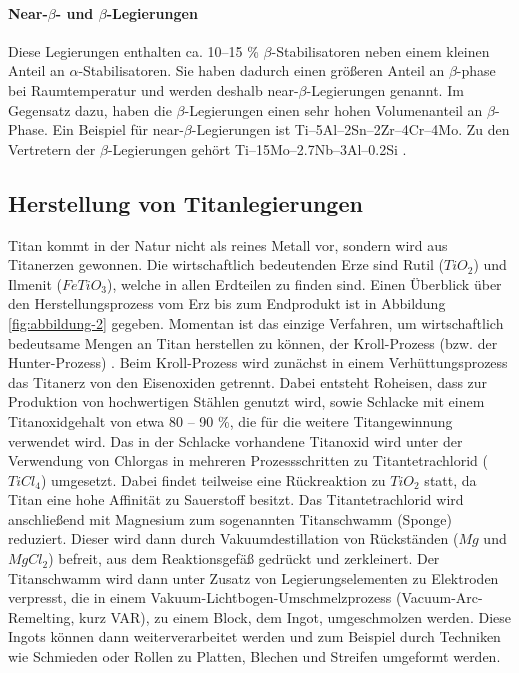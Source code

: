 \paragraph{Near-$\beta$- und $\beta$-Legierungen}
Diese Legierungen enthalten ca. 10--15 \% $\beta$-Stabilisatoren neben einem kleinen Anteil an $\alpha$-Stabilisatoren. Sie haben dadurch einen größeren Anteil an $\beta$-phase bei Raumtemperatur und werden deshalb near-$\beta$-Legierungen genannt. Im Gegensatz dazu, haben die $\beta$-Legierungen einen sehr hohen Volumenanteil an $\beta$-Phase. Ein Beispiel für near-$\beta$-Legierungen ist Ti–5Al–2Sn–2Zr–4Cr–4Mo. Zu den Vertretern der $\beta$-Legierungen gehört Ti–15Mo–2.7Nb–3Al–0.2Si \cite{Boyer.2007,M.J.Donachie.2010}.

\subsection{Herstellung von Titanlegierungen}
Titan kommt in der Natur nicht als reines Metall vor, sondern wird aus Titanerzen gewonnen. Die wirtschaftlich bedeutenden Erze sind Rutil ($TiO_2$) und Ilmenit ($FeTiO_3$), welche in allen Erdteilen zu finden sind. Einen Überblick über den Herstellungsprozess vom Erz bis zum Endprodukt ist in Abbildung \ref{fig:abbildung-2} gegeben. Momentan ist das einzige Verfahren, um wirtschaftlich bedeutsame Mengen an Titan herstellen zu können, der Kroll-Prozess (bzw. der Hunter-Prozess) \cite{C.Leyens.2005}. Beim Kroll-Prozess wird zunächst in einem Verhüttungsprozess das Titanerz von den Eisenoxiden getrennt. Dabei entsteht Roheisen, dass zur Produktion von hochwertigen Stählen genutzt wird, 
sowie Schlacke mit einem Titanoxidgehalt von etwa 80 -- 90 \%, die für die weitere Titangewinnung verwendet wird. Das in der Schlacke vorhandene Titanoxid wird unter der Verwendung von Chlorgas in mehreren Prozessschritten zu Titantetrachlorid ($TiCl_4$) umgesetzt. Dabei findet teilweise eine Rückreaktion zu $TiO_2$ statt, da Titan eine hohe Affinität zu Sauerstoff besitzt. Das Titantetrachlorid wird anschließend mit Magnesium zum sogenannten Titanschwamm (Sponge) reduziert. Dieser wird dann durch Vakuumdestillation von Rückständen ($Mg$ und $MgCl_2$) befreit, aus dem Reaktionsgefäß gedrückt und zerkleinert. Der Titanschwamm wird dann unter Zusatz von Legierungselementen zu Elektroden verpresst, die in einem Vakuum-Lichtbogen-Umschmelzprozess (Vacuum-Arc-Remelting, kurz VAR), zu einem Block, dem Ingot, umgeschmolzen werden. Diese Ingots können dann weiterverarbeitet werden und zum Beispiel durch Techniken wie Schmieden oder Rollen zu Platten, Blechen und Streifen umgeformt werden.  

